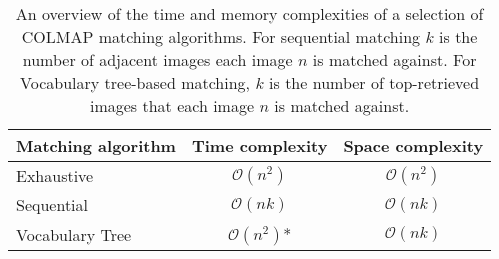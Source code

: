 \begin{table}[h] 
\centering
\begin{tabular}{lcc}
\hline
Matching algorithm & \multicolumn{1}{l}{Time complexity} & \multicolumn{1}{l}{Space complexity} \\ \hline
Exhaustive         & $\mathcal{O}(n^2)$       & $\mathcal{O}(n^2)$  \\
Sequential         & $\mathcal{O}(n k)$ & $\mathcal{O}(n k)$        \\
Vocabulary Tree    & $\mathcal{O}(n^2)$*       & $\mathcal{O}(n k)$  \\ \hline
\end{tabular}
\caption{An overview of the time and memory complexities of a selection of COLMAP matching algorithms. For sequential matching $k$ is the number of adjacent images each image $n$ is matched against. For Vocabulary tree-based matching, $k$ is the number of top-retrieved images that each image $n$ is matched against.}
\label{tab:colmap-feature-complexity}
\end{table}